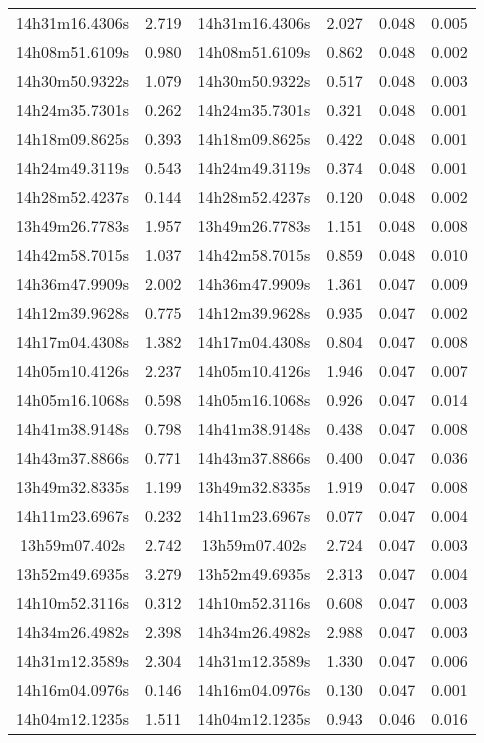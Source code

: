 \begin{table}
\begin{tabular}{cccccc}
14h31m16.4306s & 2.719 & 14h31m16.4306s & 2.027 & 0.048 & 0.005 \\
14h08m51.6109s & 0.980 & 14h08m51.6109s & 0.862 & 0.048 & 0.002 \\
14h30m50.9322s & 1.079 & 14h30m50.9322s & 0.517 & 0.048 & 0.003 \\
14h24m35.7301s & 0.262 & 14h24m35.7301s & 0.321 & 0.048 & 0.001 \\
14h18m09.8625s & 0.393 & 14h18m09.8625s & 0.422 & 0.048 & 0.001 \\
14h24m49.3119s & 0.543 & 14h24m49.3119s & 0.374 & 0.048 & 0.001 \\
14h28m52.4237s & 0.144 & 14h28m52.4237s & 0.120 & 0.048 & 0.002 \\
13h49m26.7783s & 1.957 & 13h49m26.7783s & 1.151 & 0.048 & 0.008 \\
14h42m58.7015s & 1.037 & 14h42m58.7015s & 0.859 & 0.048 & 0.010 \\
14h36m47.9909s & 2.002 & 14h36m47.9909s & 1.361 & 0.047 & 0.009 \\
14h12m39.9628s & 0.775 & 14h12m39.9628s & 0.935 & 0.047 & 0.002 \\
14h17m04.4308s & 1.382 & 14h17m04.4308s & 0.804 & 0.047 & 0.008 \\
14h05m10.4126s & 2.237 & 14h05m10.4126s & 1.946 & 0.047 & 0.007 \\
14h05m16.1068s & 0.598 & 14h05m16.1068s & 0.926 & 0.047 & 0.014 \\
14h41m38.9148s & 0.798 & 14h41m38.9148s & 0.438 & 0.047 & 0.008 \\
14h43m37.8866s & 0.771 & 14h43m37.8866s & 0.400 & 0.047 & 0.036 \\
13h49m32.8335s & 1.199 & 13h49m32.8335s & 1.919 & 0.047 & 0.008 \\
14h11m23.6967s & 0.232 & 14h11m23.6967s & 0.077 & 0.047 & 0.004 \\
13h59m07.402s & 2.742 & 13h59m07.402s & 2.724 & 0.047 & 0.003 \\
13h52m49.6935s & 3.279 & 13h52m49.6935s & 2.313 & 0.047 & 0.004 \\
14h10m52.3116s & 0.312 & 14h10m52.3116s & 0.608 & 0.047 & 0.003 \\
14h34m26.4982s & 2.398 & 14h34m26.4982s & 2.988 & 0.047 & 0.003 \\
14h31m12.3589s & 2.304 & 14h31m12.3589s & 1.330 & 0.047 & 0.006 \\
14h16m04.0976s & 0.146 & 14h16m04.0976s & 0.130 & 0.047 & 0.001 \\
14h04m12.1235s & 1.511 & 14h04m12.1235s & 0.943 & 0.046 & 0.016 \\

\end{tabular}
\end{table}
